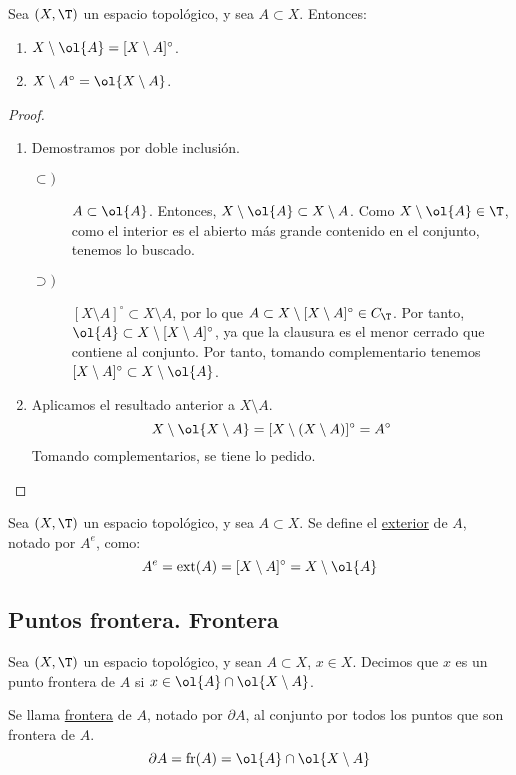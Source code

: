 \begin{prop}
    Sea $(X,\T)$ un espacio topológico, y sea $A\subset X$. Entonces:
    \begin{enumerate}
        \item $X\setminus \ol{A}=[X\setminus A]^\circ$.
        \item $X\setminus A^\circ = \ol{X\setminus A}$.
    \end{enumerate}
\end{prop}
\begin{proof}\
    \begin{enumerate}
        \item Demostramos por doble inclusión.
        \begin{description}
            \item[$\subset)$] $A\subset \ol{A}$. Entonces, $X\setminus \ol{A}\subset X\setminus A$. Como $X\setminus \ol{A}\in \T$, como el interior es el abierto más grande contenido en el conjunto, tenemos lo buscado.
            
            \item[$\supset)$] $[X\setminus A]^\circ\subset X\setminus A$, por lo que $A\subset X\setminus [X\setminus A]^\circ \in C_\T$. Por tanto, $\ol{A}\subset X\setminus [X\setminus A]^\circ$, ya que la clausura es el menor cerrado que contiene al conjunto. Por tanto, tomando complementario tenemos $[X\setminus A]^\circ\subset X\setminus \ol{A}$.
        \end{description}

        \item Aplicamos el resultado anterior a $X\setminus A$.
        $$X\setminus \ol{X\setminus A} = [X\setminus (X\setminus A)]^\circ =A^\circ$$
        Tomando complementarios, se tiene lo pedido.
    \end{enumerate}
\end{proof}


\begin{definicion}
    Sea $(X,\T)$ un espacio topológico, y sea $A\subset X$. Se define el \ul{exterior} de $A$, notado por $A^e$, como:
    \begin{equation*}
        A^e = \operatorname{ext}(A)=[X\setminus A]^\circ = X\setminus\ol{A}
    \end{equation*}
\end{definicion}

\subsection{Puntos frontera. Frontera}
\begin{definicion}
    Sea $(X,\T)$ un espacio topológico, y sean $A\subset X$, $x\in X$. Decimos que $x$ es un punto frontera de $A$ si $x\in \ol{A}\cap \ol{X\setminus A}$.

    Se llama \ul{frontera} de $A$, notado por $\partial A$, al conjunto por todos los puntos que son frontera de $A$.
    \begin{equation*}
        \partial A = \operatorname{fr}(A)= \ol{A}\cap \ol{X\setminus A}
    \end{equation*}
\end{definicion}

